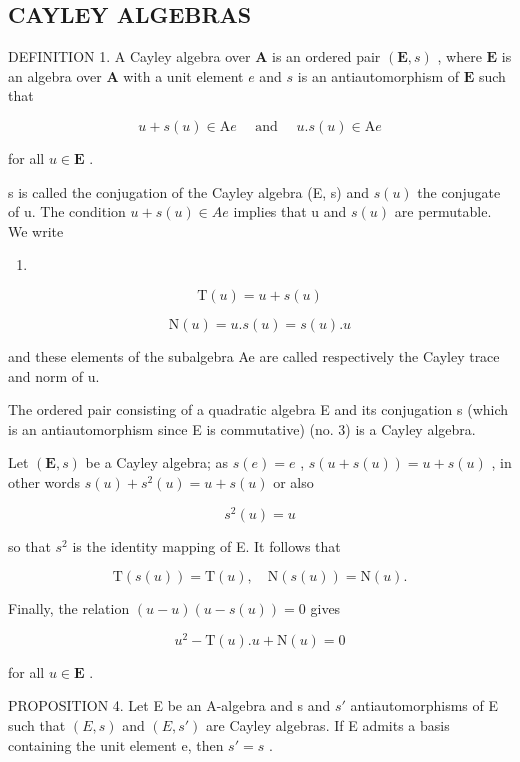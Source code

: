 \subsection{CAYLEY ALGEBRAS}

DEFINITION 1. A Cayley algebra over \(\mathbf{A}\) is an ordered pair \((\mathbf{E}, s)\) , where \(\mathbf{E}\) is an algebra over \(\mathbf{A}\) with a unit element \(e\) and \(s\) is an antiautomorphism of \(\mathbf{E}\) such that

\[
u + s (u) \in \mathrm{A} e \quad \text { and } \quad u. s (u) \in \mathrm{A} e
\]

for all \(u \in \mathbf{E}\) .

s is called the conjugation of the Cayley algebra (E, s) and \(s(u)\) the conjugate of u. The condition \(u + s(u) \in Ae\) implies that u and \(s(u)\) are permutable. We write

\begin{enumerate}
\def\labelenumi{(\arabic{enumi})}
\setcounter{enumi}{8}
\tightlist
\item
\end{enumerate}

\[
\mathrm{T} (u) = u + s (u)\tag{10}
\]

\[
\mathrm{N} (u) = u. s (u) = s (u). u
\]

and these elements of the subalgebra Ae are called respectively the Cayley trace and norm of u.

The ordered pair consisting of a quadratic algebra E and its conjugation s (which is an antiautomorphism since E is commutative) (no. 3) is a Cayley algebra.

Let \((\mathbf{E}, s)\) be a Cayley algebra; as \(s(e) = e\) , \(s(u + s(u)) = u + s(u)\) , in other words \(s(u) + s^2(u) = u + s(u)\) or also

\[
s ^ {2} (u) = u\tag{11}
\]

so that \(s^{2}\) is the identity mapping of E. It follows that

\[
\mathrm{T} (s (u)) = \mathrm{T} (u), \quad \mathrm{N} (s (u)) = \mathrm{N} (u).\tag{12}
\]

Finally, the relation \((u - u)(u - s(u)) = 0\) gives

\[
u ^ {2} - \mathrm{T} (u). u + \mathrm{N} (u) = 0\tag{13}
\]

for all \(u \in \mathbf{E}\) .

PROPOSITION 4. Let E be an A-algebra and s and \(s'\) antiautomorphisms of E such that \((E, s)\) and \((E, s')\) are Cayley algebras. If E admits a basis containing the unit element e, then \(s' = s\) .

